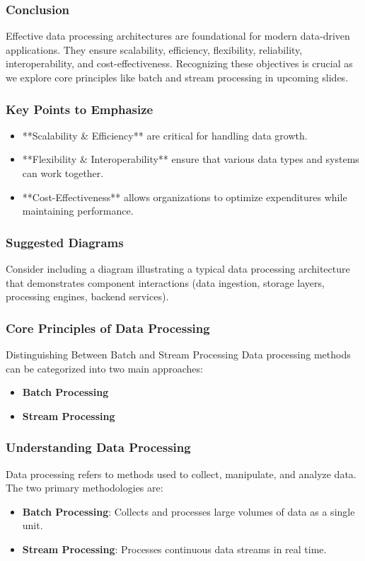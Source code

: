 \documentclass[aspectratio=169]{beamer}
\begin{document}
\begin{frame}[fragile]
    \frametitle{Conclusion}
    Effective data processing architectures are foundational for modern data-driven applications. They ensure scalability, efficiency, flexibility, reliability, interoperability, and cost-effectiveness. Recognizing these objectives is crucial as we explore core principles like batch and stream processing in upcoming slides.
\end{frame}

\begin{frame}[fragile]
    \frametitle{Key Points to Emphasize}
    \begin{itemize}
        \item **Scalability \& Efficiency** are critical for handling data growth.
        \item **Flexibility \& Interoperability** ensure that various data types and systems can work together.
        \item **Cost-Effectiveness** allows organizations to optimize expenditures while maintaining performance.
    \end{itemize}
\end{frame}

\begin{frame}[fragile]
    \frametitle{Suggested Diagrams}
    Consider including a diagram illustrating a typical data processing architecture that demonstrates component interactions (data ingestion, storage layers, processing engines, backend services).
\end{frame}

\begin{frame}[fragile]
    \frametitle{Core Principles of Data Processing}
    \begin{block}{Distinguishing Between Batch and Stream Processing}
        Data processing methods can be categorized into two main approaches: 
        \begin{itemize}
            \item \textbf{Batch Processing}
            \item \textbf{Stream Processing}
        \end{itemize}
    \end{block}
\end{frame}

\begin{frame}[fragile]
    \frametitle{Understanding Data Processing}
    Data processing refers to methods used to collect, manipulate, and analyze data. The two primary methodologies are:
    \begin{itemize}
        \item \textbf{Batch Processing}: Collects and processes large volumes of data as a single unit.
        \item \textbf{Stream Processing}: Processes continuous data streams in real time.
    \end{itemize}
\end{frame}
\end{document}
